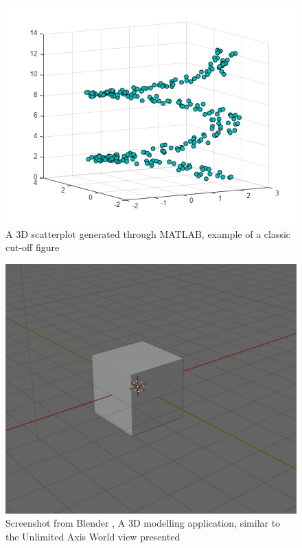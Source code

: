 \begin{figure}[h]
    \centering
    \includegraphics[width=0.7\columnwidth]{author-files/figures/SetMarkerPropertiesExample_01_MATLAB.png}
    \caption{A 3D scatterplot generated through MATLAB, example of a classic cut-off figure \cite{mathworks_3d}}
    \label{fig:MatlabPlot}
\end{figure}

\begin{figure}[h]
    \centering
    \includegraphics[width=0.7\columnwidth]{author-files/figures/worldnavblender.png}
    \caption{Screenshot from Blender \cite{blenderfoundation_2019_blenderorg}, A 3D modelling application, similar to the Unlimited Axis World view presented}
    \label{fig:blender}
\end{figure}

